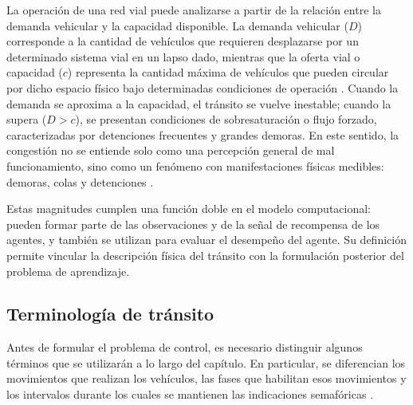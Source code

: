 La operación de una red vial puede analizarse a partir de la relación entre la demanda vehicular y la capacidad disponible. La demanda vehicular ($D$) corresponde a la cantidad de vehículos que requieren desplazarse por un determinado sistema vial en un lapso dado, mientras que la oferta vial o capacidad ($c$) representa la cantidad máxima de vehículos que pueden circular por dicho espacio físico bajo determinadas condiciones de operación \cite{calymayor}. Cuando la demanda se aproxima a la capacidad, el tránsito se vuelve inestable; cuando la supera ($D > c$), se presentan condiciones de sobresaturación o flujo forzado, caracterizadas por detenciones frecuentes y grandes demoras. En este sentido, la congestión no se entiende solo como una percepción general de mal funcionamiento, sino como un fenómeno con manifestaciones físicas medibles: demoras, colas y detenciones \cite{fernandez}.

Estas magnitudes cumplen una función doble en el modelo computacional: pueden formar parte de las observaciones y de la señal de recompensa de los agentes, y también se utilizan para evaluar el desempeño del agente. Su definición permite vincular la descripción física del tránsito con la formulación posterior del problema de aprendizaje.

\subsection{Terminología de tránsito}

Antes de formular el problema de control, es necesario distinguir algunos términos que se utilizarán a lo largo del capítulo. En particular, se diferencian los movimientos que realizan los vehículos, las fases que habilitan esos movimientos y los intervalos durante los cuales se mantienen las indicaciones semafóricas \cite{fhwa_signal_timing_manual}.

